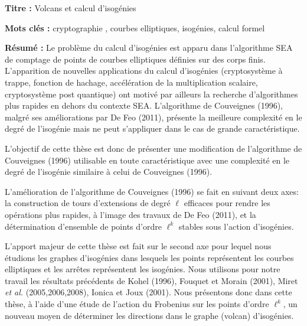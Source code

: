 \documentclass[a4paper, titlepage, 11pt]{book}
\newcommand{\titre}{Volcans et calcul d'isogénies}
\begin{document}
\begin{breakbox}

\noindent\textbf{Titre : }\titre

\vspace{2ex}

\noindent\textbf{Mots clés : }cryptographie , courbes elliptiques, isogénies, 
calcul formel

\begin{multicols}{2}
\noindent\textbf{Résumé : }
Le problème du calcul d'isogénies est apparu dans l'algorithme SEA de comptage
de points de courbes elliptiques définies sur des corps finis. L'apparition de 
nouvelles applications du calcul d'isogénies (cryptosystème à trappe, fonction 
de hachage, accélération de la multiplication scalaire, cryptosystème post 
quantique) ont motivé par ailleurs la recherche d'algorithmes plus rapides en 
dehors du contexte SEA. L'algorithme de Couveignes (1996), malgré ses 
améliorations par De Feo (2011), présente la meilleure complexité en le 
degré de l'isogénie mais ne peut s'appliquer dans le cas de grande 
caractéristique.


L'objectif de cette thèse est donc de présenter une modification de 
l'algorithme de Couveignes (1996) utilisable en toute caractéristique avec une 
complexité en le degré de l'isogénie similaire à celui de Couveignes (1996).


L'amélioration de l'algorithme de Couveignes (1996) se fait en 
suivant deux axes: la construction de tours d'extensions
de degré $\ell$ efficaces pour rendre les opérations plus rapides, à l'image 
des travaux de De Feo (2011), et la détermination d'ensemble de points d'ordre 
$\ell^k$ stables sous l'action d'isogénies.

L'apport majeur de cette thèse est fait sur le second axe pour lequel nous 
étudions les graphes d'isogénies dans lesquels les points représentent les 
courbes elliptiques et les arrêtes représentent les isogénies. Nous utilisons
pour notre travail les résultats précédents de Kohel (1996), Fouquet et Morain
(2001), Miret \emph{et al.} (2005,2006,2008), Ionica et Joux (2001). Nous 
présentons donc dans cette thèse, à l'aide d'une étude de l'action du Frobenius
sur les points d'ordre $\ell^k$, un nouveau moyen de déterminer les directions 
dans le graphe (volcan) d'isogénies.



\end{multicols}
\end{breakbox}
\end{document}
